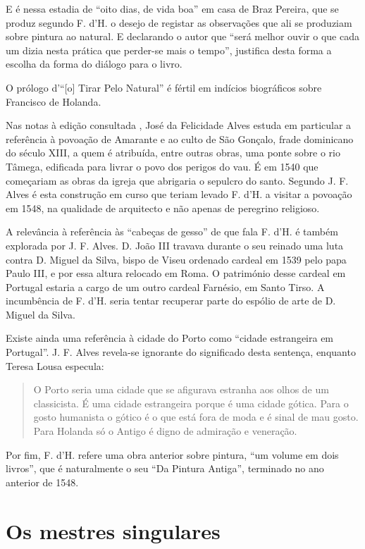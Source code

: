 \documentclass{article}
\begin{document}
E é nessa estadia de ``oito dias, de vida boa'' em casa de Braz
Pereira, que se produz segundo F. d'H. o desejo de registar as
observações que ali se produziam sobre pintura ao natural. E
declarando o autor que ``será melhor ouvir o que cada um dizia nesta
prática que perder-se mais o tempo''\cite[p12]{holanda}, justifica
desta forma a escolha da forma do diálogo para o livro.

O prólogo d'``[o] Tirar Pelo Natural'' é fértil em indícios
biográficos sobre Francisco de Holanda.

Nas notas à edição consultada \cite{holanda}, José da Felicidade Alves
estuda em particular a referência à povoação de Amarante e ao culto de
São Gonçalo, frade dominicano do século XIII, a quem é atribuída,
entre outras obras, uma ponte sobre o rio Tâmega, edificada para
livrar o povo dos perigos do vau. É em 1540 que começariam as obras da
igreja que abrigaria o sepulcro do santo. Segundo J. F. Alves é esta
construção em curso que teriam levado F. d'H. a visitar a povoação em
1548, na qualidade de arquitecto e não apenas de peregrino religioso.

A relevância à referência às ``cabeças de gesso'' de que fala
F. d'H. é também explorada por J. F. Alves. D. João III travava
durante o seu reinado uma luta contra D. Miguel da Silva, bispo de
Viseu ordenado cardeal em 1539 pelo papa Paulo III, e por essa altura
relocado em Roma. O património desse cardeal em Portugal estaria a
cargo de um outro cardeal Farnésio, em Santo Tirso. A incumbência de
F. d'H. seria tentar recuperar parte do espólio de arte de D. Miguel
da Silva.

Existe ainda uma referência à cidade do Porto como ``cidade
estrangeira em Portugal''. J. F. Alves revela-se ignorante do
significado desta sentença, enquanto Teresa Lousa\cite{teresa-desenho}
especula:

\begin{quote}
 O Porto seria uma cidade que se afigurava estranha aos olhos de um
 classicista. É uma cidade estrangeira porque é uma cidade
 gótica. Para o gosto humanista o gótico é o que está fora de moda e é
 sinal de mau gosto.  Para Holanda só o Antigo é digno de admiração e
 veneração.
\end{quote}

Por fim, F. d'H. refere uma obra anterior sobre pintura, ``um volume
em dois livros'', que é naturalmente o seu ``Da Pintura Antiga'',
terminado no ano anterior de 1548.

\section{Os mestres singulares}
\end{document}
